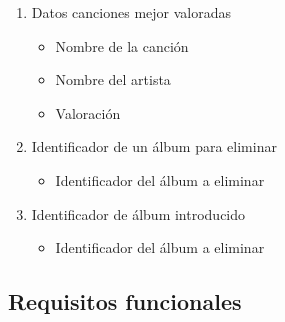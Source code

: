 \documentclass[12pt,a4paper]{article}
\begin{document}
\begin{enumerate}[label=\textnormal{RD\arabic*}]
	\item Datos canciones mejor valoradas \label{rd39}
		\begin{itemize}
			\item Nombre de la canción
			\item Nombre del artista
			\item Valoración
		\end{itemize}

	\item Identificador de un álbum para eliminar \label{rd40}
		\begin{itemize}
			\item Identificador del álbum a eliminar
		\end{itemize}
		
	\item Identificador de álbum introducido \label{rd41}
		\begin{itemize}
			\item Identificador del álbum a eliminar
		\end{itemize}
\end{enumerate}


\subsection{Requisitos funcionales}
\end{document}
